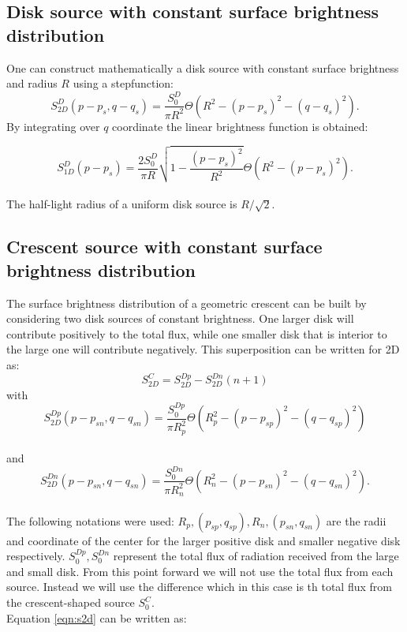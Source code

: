 \subsection{Disk source with constant surface brightness distribution}

One can construct mathematically a disk source with constant surface brightness and radius $R$ using a stepfunction:
\begin{equation}
 S_{2D}^D(p-p_s, q-q_s) = \frac{S_0^D}{\pi R^2} \Theta \left( R^2 - \left( p-p_s \right)^2 - \left( q-q_s \right)^2 \right).
\end{equation}
By integrating over $q$ coordinate the linear brightness function is obtained:


\begin{equation}
 S_{1D}^D(p-p_s) = \frac{2 S_0^D}{\pi R}  \sqrt{1 - \frac{(p-p_s)^2}{R^2} }    \Theta \left( R^2 - \left( p-p_s \right)^2 \right).
\end{equation}
\\
The half-light radius of a uniform disk source is $R/\sqrt{2}$.

\subsection{Crescent source with constant surface brightness distribution}

The surface brightness distribution of a geometric crescent can be built by considering two disk sources of constant brightness. One larger disk will contribute positively to the total flux, while one smaller disk 
that is interior to the large one will contribute negatively. This superposition can be written for 2D as:\\

\begin{equation}
 S_{2D}^C =  S_{2D}^{Dp} -  S_{2D}^{Dn}   (n+1)
 \label{eqn:s2d}
\end{equation}
with\\

\begin{equation}
 S_{2D}^{Dp}(p-p_{sn}, q-q_{sn}) = \frac{S_0^{Dp}}{\pi R_p^2} \Theta \left( R_p^2 - \left( p-p_{sp} \right)^2 - \left( q-q_{sp} \right)^2 \right)
\end{equation}
\\
and
\begin{equation}
 S_{2D}^{Dn}(p-p_{sn}, q-q_{sn}) = \frac{S_0^{Dn}}{\pi R_n^2} \Theta \left( R_n^2 - \left( p-p_{sn} \right)^2 - \left( q-q_{sn} \right)^2 \right).
\end{equation}
\\
The following notations were used: $R_p, (p_{sp}, q_{sp}), R_n, (p_{sn},q_{sn})$ are the radii and coordinate of the center for the larger positive disk and smaller negative disk respectively.  $S_0^{Dp},S_0^{Dn}$ represent the total flux of radiation received from the large and small disk. From this point forward we will not use the total flux from each source. Instead we will 
use the difference which in this case is th total flux from the crescent-shaped source $S_0^C$. \\
Equation \ref{eqn:s2d} can be written as:\\


